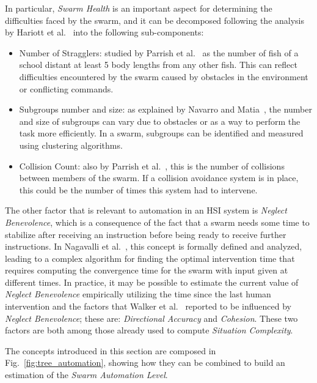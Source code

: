 \documentclass[journal]{IEEEtran}
\begin{document}
In particular, \textit{Swarm Health} is an important aspect for determining the difficulties faced by the swarm, and it can be decomposed following the analysis by Hariott et al.~\cite{harriott2014biologically} into the following sub-components:

\begin{itemize}
\item Number of Stragglers: studied by Parrish et al.~\cite{parrish2002self} as the number of fish of a school distant at least 5 body lengths from any other fish. This can reflect difficulties encountered by the swarm caused by obstacles in the environment or conflicting commands.

\item Subgroups number and size: as explained by Navarro and Matia~\cite{navarro2009proposal}, the number and size of subgroups can vary due to obstacles or as a way to perform the task more efficiently. In a swarm, subgroups can be identified and measured using clustering algorithms.

\item Collision Count: also by Parrish et al.~\cite{parrish2002self}, this is the number of collisions between members of the swarm. If a collision avoidance system is in place, this could be the number of times this system had to intervene.
\end{itemize}

The other factor that is relevant to automation in an HSI system is \textit{Neglect Benevolence}, which is a consequence of the fact that a swarm needs some time to stabilize after receiving an instruction before being ready to receive further instructions. In Nagavalli et al.~\cite{nagavalli2014neglect}, this concept is formally defined and analyzed, leading to a complex algorithm for finding the optimal intervention time that requires computing the convergence time for the swarm with input given at different times. In practice, it may be possible to estimate the current value of \textit{Neglect Benevolence} empirically utilizing the time since the last human intervention and the factors that Walker et al.~\cite{walker2012investigating} reported to be influenced by \textit{Neglect Benevolence}; these are: \textit{Directional Accuracy} and \textit{Cohesion}. These two factors are both among those already used to compute \textit{Situation Complexity}.

The concepts introduced in this section are composed in Fig.~\ref{fig:tree_automation}, showing how they can be combined to build an estimation of the \textit{Swarm Automation Level}.
\end{document}
